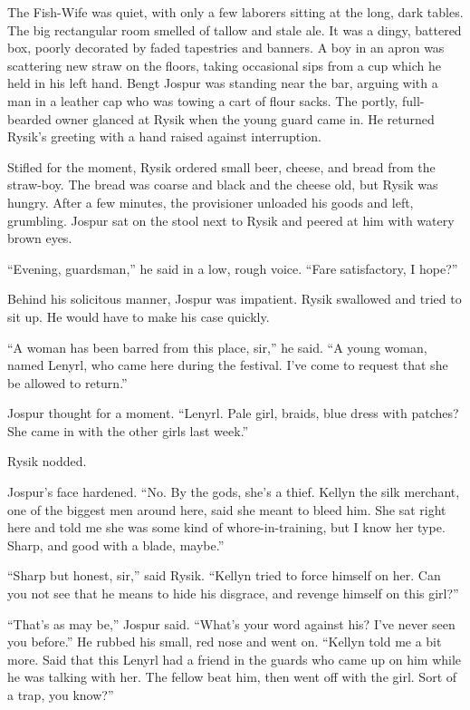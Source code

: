 \documentclass[10pt,a4paper]{article}
\begin{document}
The Fish-Wife was quiet, with only a few laborers sitting at the
long, dark tables. The big rectangular room smelled of tallow and
stale ale. It was a dingy, battered box, poorly decorated by faded
tapestries and banners. A boy in an apron was scattering new straw
on the floors, taking occasional sips from a cup which he held in his
left hand. Bengt Jospur was standing near the bar, arguing with a man
in a leather cap who was towing a cart of flour sacks. The portly,
full-bearded owner glanced at Rysik when the young guard came in. He
returned Rysik's greeting with a hand raised against interruption.

Stifled for the moment, Rysik ordered small beer, cheese, and bread
from the straw-boy. The bread was coarse and black and the cheese
old, but Rysik was hungry. After a few minutes, the provisioner
unloaded his goods and left, grumbling. Jospur sat on the stool
next to Rysik and peered at him with watery brown eyes.

``Evening, guardsman,'' he said in a low, rough voice. ``Fare
satisfactory, I hope?''

Behind his solicitous manner, Jospur was impatient. Rysik swallowed
and tried to sit up. He would have to make his case quickly.

``A woman has been barred from this place, sir,'' he said. ``A young
woman, named Lenyrl, who came here during the festival. I've come
to request that she be allowed to return.''

Jospur thought for a moment. ``Lenyrl. Pale girl, braids, blue dress
with patches? She came in with the other girls last week.''

Rysik nodded.

Jospur's face hardened. ``No. By the gods, she's a thief. Kellyn
the silk merchant, one of the biggest men around here, said she
meant to bleed him. She sat right here and told me she was some
kind of whore-in-training, but I know her type. Sharp, and good
with a blade, maybe.''

``Sharp but honest, sir,'' said Rysik. ``Kellyn tried to force himself
on her. Can you not see that he means to hide his disgrace, and
revenge himself on this girl?''

``That's as may be,'' Jospur said. ``What's your word against his? I've
never seen you before.'' He rubbed his small, red nose and went on.
``Kellyn told me a bit more. Said that this Lenyrl had a friend in the
guards who came up on him while he was talking with her. The fellow
beat him, then went off with the girl. Sort of a trap, you know?''
\end{document}
